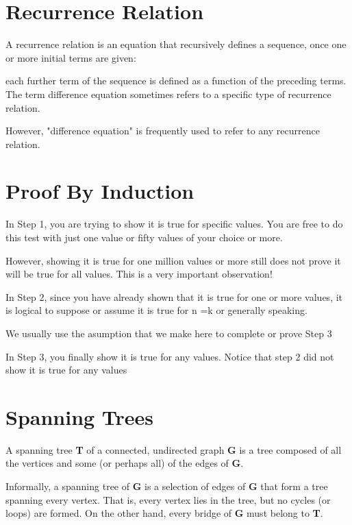 \documentclass[]{article}
\title{}
\author{}
\begin{document}

\section{Recurrence Relation}


A recurrence relation is an equation that recursively defines a sequence, once one or more initial terms are given: 

each further term of the sequence is defined as a function of the preceding terms.
The term difference equation sometimes refers to a specific type of recurrence relation. 

However, "difference equation" is frequently used to refer to any recurrence relation.



\section{Proof By Induction}
In Step 1, you are trying to show it is true for specific values. You are free to do this test with just one value or fifty values of your choice or more.

However, showing it is true for one million values or more still does not prove it will be true for all values. This is a very important observation!

In Step 2, since you have already shown that it is true for one or more values, it is logical to suppose or assume it is true for n =k or generally speaking.

We usually use the asumption that we make here to complete or prove Step  3

In Step 3, you finally show it is true for any values. Notice that step 2 did not show it is true for any values

\section{Spanning Trees}
A spanning tree \textbf{T} of a connected, undirected graph \textbf{G} is a tree composed of all the vertices and some (or perhaps all) of the edges of \textbf{G}. 

Informally, a spanning tree of \textbf{G} is a selection of edges of \textbf{G} that form a tree spanning every vertex. That is, every vertex lies in the tree, but no cycles (or loops) are formed. On the other hand, every bridge of \textbf{G} must belong to \textbf{T}.
\end{document}
